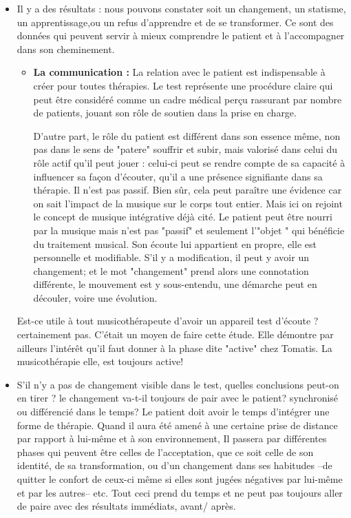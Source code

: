 \begin{itemize}
\item Il y a des résultats : nous pouvons constater soit un changement,
un statisme, un apprentissage,ou un refus d'apprendre et de se transformer.
Ce sont des données qui peuvent servir à mieux comprendre le patient
et à l'accompagner dans son cheminement.
\begin{itemize}
	\item \textbf{La communication : }
	La relation avec le patient est indispensable à créer pour toutes thérapies.
	Le test représente une procédure claire qui peut être considéré comme un cadre médical perçu rassurant par nombre de patients, jouant son rôle de soutien dans la prise en charge.
	
	D'autre part, le rôle du patient est différent dans son essence même, non pas dans le sens de "patere" souffrir et subir, mais valorisé dans celui du rôle actif qu'il peut jouer : celui-ci peut se rendre compte de sa capacité à influencer sa façon d'écouter, qu'il a une présence signifiante dans sa thérapie.  Il n'est pas passif. Bien sûr, cela peut paraître une évidence car on sait l'impact de la musique sur le corps tout entier. Mais ici on rejoint  le concept de musique intégrative déjà cité\autocite[Cf.]{vrait_musicotherapie_2018}. Le patient peut être nourri par la musique mais n'est pas "passif" et seulement l'"objet " qui bénéficie du traitement musical. Son  écoute lui appartient en propre, elle est personnelle et modifiable. S'il y a modification, il peut y avoir un changement; et le mot "changement" prend alors une connotation différente,  le mouvement est y  sous-entendu,  une démarche peut en découler, voire une évolution. 
\end{itemize}


Est-ce utile à tout musicothérapeute d'avoir un appareil test d'écoute ? certainement pas. C'était un moyen de faire cette étude. Elle démontre par ailleurs  l'intérêt qu'il faut donner à la phase dite "active" chez Tomatis. La musicothérapie elle, est toujours active!

\item S'il n'y a pas de changement visible dans le test, quelles conclusions
peut-on en tirer ? le changement va-t-il toujours de pair avec le
patient? synchronisé ou différencié dans le temps?
Le patient doit avoir le temps d'intégrer une forme de thérapie. Quand il aura été amené à une certaine prise de distance par rapport à lui-même et à son environnement, Il passera par différentes phases qui peuvent être celles de l'acceptation, que ce soit celle de son identité, de sa transformation, ou d'un changement dans ses habitudes --de quitter le confort de ceux-ci même si elles sont jugées négatives par lui-même et par les autres-- etc. Tout ceci prend du temps et ne peut pas 
toujours  aller de paire avec des résultats immédiats, avant/ après.



\end{itemize}
